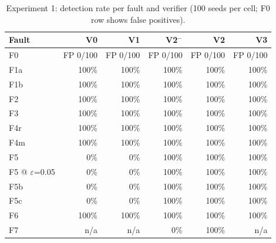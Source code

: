 \begin{table}[t]
  \centering
  \caption{Experiment 1: detection rate per fault and verifier (100 seeds per cell; F0 row shows false positives).}
  \label{tab:e1}
  \begin{tabular}{lrrrrr}
    \toprule
    Fault & V0 & V1 & V2$^{-}$ & V2 & V3 \\
    \midrule
    F0 & FP 0/100 & FP 0/100 & FP 0/100 & FP 0/100 & FP 0/100 \\
    F1a & 100\% & 100\% & 100\% & 100\% & 100\% \\
    F1b & 100\% & 100\% & 100\% & 100\% & 100\% \\
    F2 & 100\% & 100\% & 100\% & 100\% & 100\% \\
    F3 & 100\% & 100\% & 100\% & 100\% & 100\% \\
    F4r & 100\% & 100\% & 100\% & 100\% & 100\% \\
    F4m & 100\% & 100\% & 100\% & 100\% & 100\% \\
    F5 & 0\% & 0\% & 100\% & 100\% & 100\% \\
    F5 @ $\varepsilon$=0.05 & 0\% & 0\% & 100\% & 100\% & 100\% \\
    F5b & 0\% & 0\% & 100\% & 100\% & 100\% \\
    F5c & 0\% & 0\% & 100\% & 100\% & 100\% \\
    F6 & 100\% & 100\% & 100\% & 100\% & 100\% \\
    F7 & n/a & n/a & 0\% & 100\% & n/a \\
    \bottomrule
  \end{tabular}
\end{table}
